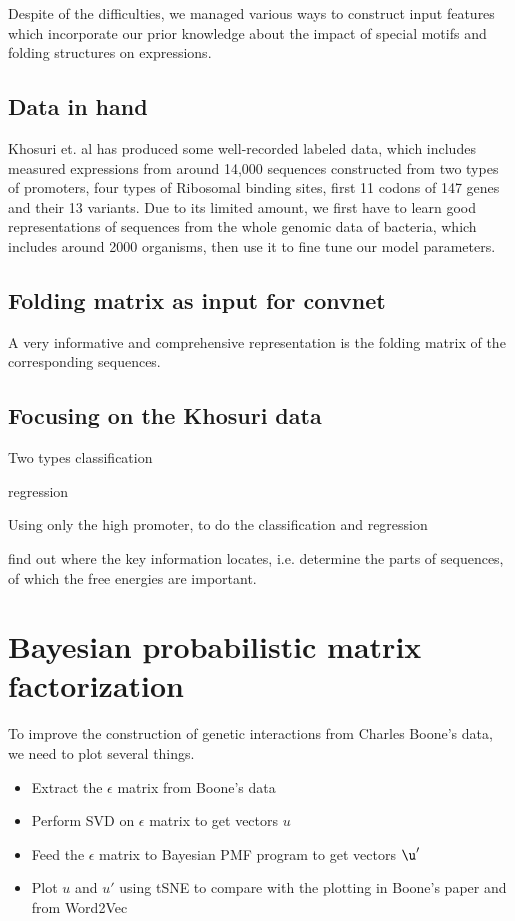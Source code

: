 \documentclass[paper=a4, fontsize=12pt]{scrartcl}	%
\numberwithin{equation}{section}					%
\numberwithin{figure}{section}					%
\numberwithin{table}{section}					%
\begin{document}
Despite of the difficulties, we managed various ways to construct input features which incorporate our prior knowledge about the impact of special motifs and folding structures on expressions. 

\subsection{Data in hand}
Khosuri et. al \cite{} has produced some well-recorded labeled data, which includes measured expressions from around 14,000 sequences constructed from two types of promoters, four types of Ribosomal binding sites, first 11 codons of 147 genes and their 13 variants. Due to its limited amount, we first have to learn good representations of sequences from the whole genomic data of bacteria, which includes around 2000 organisms, then use it to fine tune our model parameters. 

\subsection{Folding matrix as input for convnet}
A very informative and comprehensive representation is the folding matrix of the corresponding sequences. 


\subsection{Focusing on the Khosuri data}
Two types classification

regression

Using only the high promoter, to do the classification and regression

find out where the key information locates, i.e. determine the parts of sequences, of which the free energies are important. 

\section{Bayesian probabilistic matrix factorization}
To improve the construction of genetic interactions from Charles Boone's data, we need to plot several things.
\begin{itemize}
\item Extract the $\epsilon$ matrix from Boone's data
\item Perform SVD on $\epsilon$ matrix to get vectors $u$
\item Feed the $\epsilon$ matrix to Bayesian PMF program to get vectors $\u'$
\item Plot $u$ and $u'$ using tSNE to compare with the plotting in Boone's paper and from Word2Vec
\end{itemize}
\end{document}
